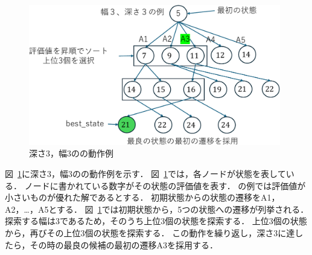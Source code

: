 \begin{figure}[tbp]
  \centering
  \includegraphics[width=11cm]{img/beam_search.pdf}
  \caption{深さ3，幅3のの動作例}
  \label{beam_search}
\end{figure}
図~\ref{beam_search}に深さ3，幅3のの動作例を示す．
図~\ref{beam_search}では，各ノードが状態を表している．
ノードに書かれている数字がその状態の評価値を表す．
の例では評価値が小さいものが優れた解であるとする．
初期状態からの状態の遷移をA1，A2，\dots ，A5とする．
図~\ref{beam_search}では初期状態から，5つの状態への遷移が列挙される．
探索する幅は3であるため，そのうち上位3個の状態を探索する．
上位3個の状態から，再びその上位3個の状態を探索する．
この動作を繰り返し，深さ3に達したら，その時の最良の候補の最初の遷移A3を採用する．
